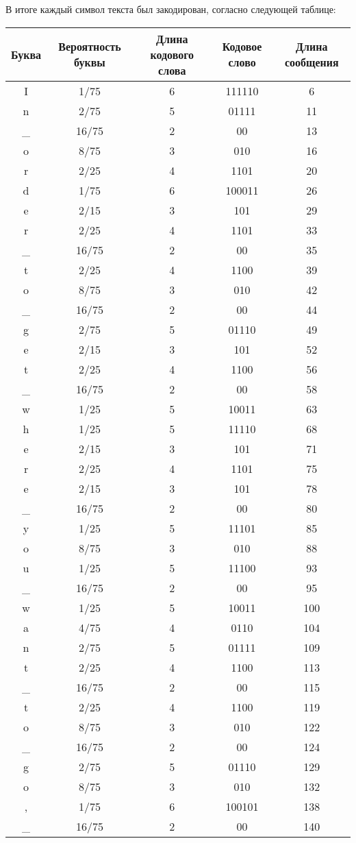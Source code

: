 В итоге каждый символ текста был закодирован, согласно следующей таблице:
\begin{center}
    \begin{longtable}{|c|c|c|c|c|}
        \hline
        Буква&Вероятность буквы&Длина кодового слова&Кодовое слово&Длина сообщения \\
        \hline  I&1/75&6&111110&6\\  \hline  n&2/75&5&01111&11\\  \hline  \_&16/75&2&00&13\\  \hline  o&8/75&3&010&16\\  \hline  r&2/25&4&1101&20\\  \hline  d&1/75&6&100011&26\\  \hline  e&2/15&3&101&29\\  \hline  r&2/25&4&1101&33\\  \hline  \_&16/75&2&00&35\\  \hline  t&2/25&4&1100&39\\  \hline  o&8/75&3&010&42\\  \hline  \_&16/75&2&00&44\\  \hline  g&2/75&5&01110&49\\  \hline  e&2/15&3&101&52\\  \hline  t&2/25&4&1100&56\\  \hline  \_&16/75&2&00&58\\  \hline  w&1/25&5&10011&63\\  \hline  h&1/25&5&11110&68\\  \hline  e&2/15&3&101&71\\  \hline  r&2/25&4&1101&75\\  \hline  e&2/15&3&101&78\\  \hline  \_&16/75&2&00&80\\  \hline  y&1/25&5&11101&85\\  \hline  o&8/75&3&010&88\\  \hline  u&1/25&5&11100&93\\  \hline  \_&16/75&2&00&95\\  \hline  w&1/25&5&10011&100\\  \hline  a&4/75&4&0110&104\\  \hline  n&2/75&5&01111&109\\  \hline  t&2/25&4&1100&113\\  \hline  \_&16/75&2&00&115\\  \hline  t&2/25&4&1100&119\\  \hline  o&8/75&3&010&122\\  \hline  \_&16/75&2&00&124\\  \hline  g&2/75&5&01110&129\\  \hline  o&8/75&3&010&132\\  \hline  ,&1/75&6&100101&138\\  \hline  \_&16/75&2&00&140\\  
\end{longtable}
\end{center}
